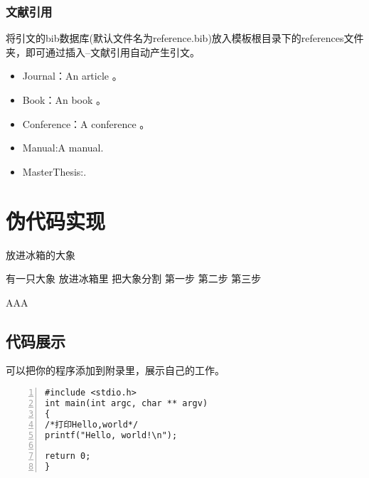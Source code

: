 \subsubsection{文献引用}
将引文的bib数据库(默认文件名为reference.bib)放入模板根目录下的references文件夹，即可通过插入--文献引用自动产生引文。
\begin{itemize}
    \item Journal：An article 。
    \item Book：An book \cite{IEEE-1363,tex,companion}。
    \item Conference：A conference \cite{kocher99,DPMG,cnproceed}。
    \item Manual:A manual\cite{NPB2}.
    \item MasterThesis:\cite{zhubajie,metamori2004,shaheshang,FistSystem01}.
\end{itemize}
\section{伪代码实现}
\begin{algorithm}
    \caption{放进冰箱的大象}\label{算法实例}
    \begin{algorithmic}
        \REQUIRE 有一只大象
        \ENSURE 放进冰箱里
        \STATE 把大象分割
        \ENDIF
        \ENDFOR
        \STATE 第一步
        \STATE 第二步
        \STATE 第三步
    \end{algorithmic}
    AAA\end{algorithm}
\subsection{代码展示}
可以把你的程序添加到附录里，展示自己的工作。
\begin{lstlisting}[language={[ANSI]C}, numbers=left]
#include <stdio.h>
int main(int argc, char ** argv)
{
/*打印Hello,world*/
printf("Hello, world!\n");

return 0;
}
\end{lstlisting}
